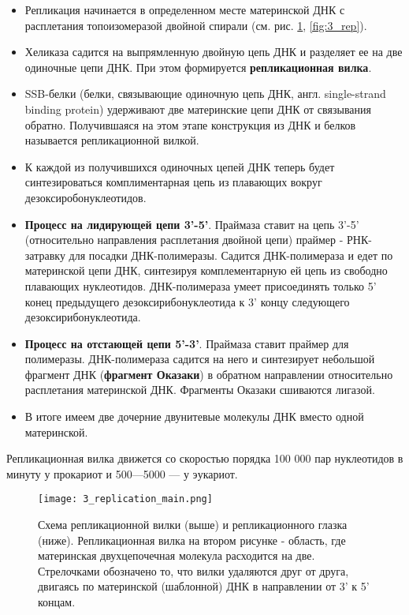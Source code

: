 \begin{itemize}
    \item Репликация начинается в определенном месте материнской ДНК с расплетания топоизомеразой двойной спирали (см. рис. \ref{fig:3_replication_main}, \ref{fig:3_rep}).
    
    \item Хеликаза садится на выпрямленную двойную цепь ДНК и разделяет ее на две одиночные цепи ДНК. При этом формируется \textbf{репликационная вилка}. 
    
    \item SSB-белки (белки, связывающие одиночную цепь ДНК, англ. single-strand binding protein) удерживают две материнские цепи ДНК от связывания обратно. Получившаяся на этом этапе конструкция из ДНК и белков называется репликационной вилкой.
    
    \item К каждой из получившихся одиночных цепей ДНК теперь будет синтезироваться комплиментарная цепь из плавающих вокруг дезоксиробонуклеотидов.
    
    \item \textbf{Процесс на лидирующей цепи  3'-5'}. Праймаза ставит на цепь 3'-5' (относительно направления расплетания двойной цепи) праймер - РНК-затравку для посадки ДНК-полимеразы. Садится ДНК-полимераза и едет по материнской цепи ДНК, синтезируя комплементарную ей цепь из свободно плавающих нуклеотидов. ДНК-полимераза умеет присоединять только 5' конец предыдущего дезоксирибонуклеотида к 3' концу следующего дезоксирибонуклеотида. 
    
    \item \textbf{Процесс на отстающей цепи 5'-3'}. Праймаза ставит праймер для полимеразы. ДНК-полимераза садится на него и синтезирует небольшой фрагмент ДНК (\textbf{фрагмент Оказаки}) в обратном направлении относительно расплетания материнской ДНК. Фрагменты Оказаки сшиваются лигазой.
    
    \item В итоге имеем две дочерние двунитевые молекулы ДНК вместо одной материнской.
    
\end{itemize}

Репликационная вилка движется со скоростью порядка 100 000 пар нуклеотидов в минуту у прокариот и 500—5000 — у эукариот.

\begin{figure}[h!]
    \centering
    \texttt{[image: 3\_replication\_main.png]}
    \caption{Схема репликационной вилки (выше) и репликационного глазка (ниже). Репликационная вилка на втором рисунке - область, где материнская двухцепочечная молекула расходится на две. Стрелочками обозначено то, что вилки удаляются друг от друга, двигаясь по материнской (шаблонной) ДНК в направлении от 3' к 5' концам.}
    \label{fig:3_replication_main}
\end{figure}

